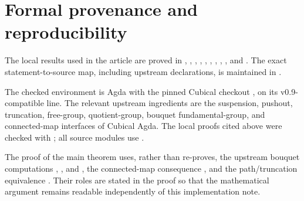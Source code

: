 \appendix
\section{Formal provenance and reproducibility}

The local results used in the article are proved in , , , , , , , , , and . The exact statement-to-source map, including upstream declarations, is maintained in .

The checked environment is Agda  with the pinned Cubical checkout , on its v0.9-compatible line. The relevant upstream ingredients are the suspension, pushout, truncation, free-group, quotient-group, bouquet fundamental-group, and connected-map interfaces of Cubical Agda. The local proofs cited above were checked with ; all source modules use \AgdaOptions.

The proof of the main theorem uses, rather than re-proves, the upstream bouquet computations , , and , the connected-map consequence , and the path/truncation equivalence . Their roles are stated in the proof so that the mathematical argument remains readable independently of this implementation note.
